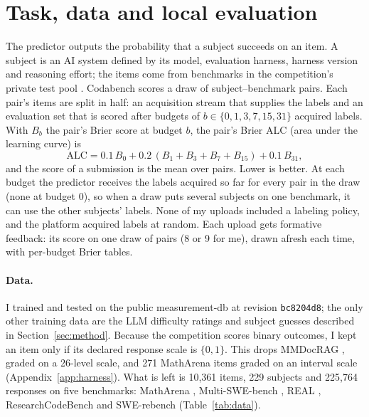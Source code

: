 \section{Task, data and local evaluation}\label{sec:data}

The predictor outputs the probability that a subject succeeds on an item. A subject is an AI system defined by its model, evaluation harness, harness version and reasoning effort; the items come from benchmarks in the competition's private test pool \citep{truong2026paiec}. Codabench \citep{xu2022codabench} scores a draw of subject--benchmark pairs. Each pair's items are split in half: an acquisition stream that supplies the labels and an evaluation set that is scored after budgets of $b \in \{0, 1, 3, 7, 15, 31\}$ acquired labels. With $B_b$ the pair's Brier score \citep{brier1950} at budget $b$, the pair's Brier ALC (area under the learning curve) is
\begin{equation}
  \mathrm{ALC} = 0.1\,B_0 + 0.2\,(B_1 + B_3 + B_7 + B_{15}) + 0.1\,B_{31},
  \label{eq:alc}
\end{equation}
and the score of a submission is the mean over pairs. Lower is better. At each budget the predictor receives the labels acquired so far for every pair in the draw (none at budget 0), so when a draw puts several subjects on one benchmark, it can use the other subjects' labels. None of my uploads included a labeling policy, and the platform acquired labels at random. Each upload gets formative feedback: its score on one draw of pairs (8 or 9 for me), drawn afresh each time, with per-budget Brier tables.

\paragraph{Data.}
I trained and tested on the public measurement-db \citep{measurementdb2026} at revision \texttt{bc8204d8}; the only other training data are the LLM difficulty ratings and subject guesses described in Section~\ref{sec:method}. Because the competition scores binary outcomes, I kept an item only if its declared response scale is $\{0,1\}$. This drops MMDocRAG \citep{dong2025mmdocrag}, graded on a 26-level scale, and 271 MathArena items graded on an interval scale (Appendix~\ref{app:harness}). What is left is 10,361 items, 229 subjects and 225,764 responses on five benchmarks: MathArena \citep{balunovic2025matharena}, Multi-SWE-bench \citep{zan2025multiswe}, REAL \citep{garg2025real}, ResearchCodeBench \citep{hua2025researchcodebench} and SWE-rebench \citep{badertdinov2025swerebench} (Table~\ref{tab:data}).

